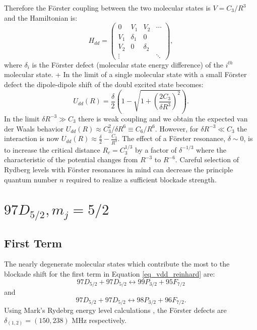 Therefore the F\"{o}rster coupling between the two molecular states is $V = C_3/R^{3}$ and the Hamiltonian is:
\begin{equation}
  \label{eq_hdd}
  H_{dd} =
    \left(
      \begin{array}{cccc}
        0      & V_1      & V_2      & \cdots \\
        V_1    & \delta_1 & 0        & \\
        V_2    & 0        & \delta_2 & \\
        \vdots &          &          & \ddots
      \end{array}
    \right),
\end{equation}
where $\delta_i$ is the F\"{o}rster defect (molecular state energy difference) of the $i^{th}$ molecular state.
+
In the limit of a single molecular state with a small F\"{o}rster defect the dipole-dipole shift of the doubl excited state becomes:
\begin{equation}
  \label{eq_vddsimple}
  U_{dd}(R) = \frac{\delta}{2}\left(1 - \sqrt{1 + \left(\frac{2C_3}{\delta R^{3}}\right)^2}\right).
\end{equation}
In the limit $\delta R^{-3}\gg C_3$ there is weak coupling and we obtain the expected van der Waals behavior $U_{dd}(R) \approx C_3^2/\delta R^{6} \equiv C_6/R^{6}$.
However, for $\delta R^{-3}\ll C_3$ the interaction is now $U_{dd}(R) \approx \frac{\delta}{2} - \frac{C_3}{R^{3}}$.
The effect of a F\"{o}rster resonance, $\delta \sim 0$, is to increase the critical distance $R_c = C_3^{1/3}$ by a factor of $\delta^{-1/3}$ where the characteristic of the potential changes from $R^{-3}$ to $R^{-6}$.
Careful selection of Rydberg levels with F\"{o}rster resonances in mind can decrease the principle quantum number $n$ required to realize a sufficient blockade strength.

\section{$97D_{5/2}, m_j = 5/2$}

\subsection{First Term}
The nearly degenerate molecular states which contribute the most to the blockade shift for the first term in Equation \ref{eq_vdd_reinhard} are:
\begin{equation}
  \label{eq_rydmol1}
  97D_{5/2} + 97D_{5/2} \leftrightarrow 99P_{3/2} + 95F_{7/2}
\end{equation}
and
\begin{equation}
  \label{eq_rydmol1}
  97D_{5/2} + 97D_{5/2} \leftrightarrow 98P_{3/2} + 96F_{7/2}.
\end{equation}
Using Mark's Rydebrg energy level calculations \cite{}, the F\"{o}rster defects are $\delta_{(1,2)}=(150,238)$ MHz respectively.

